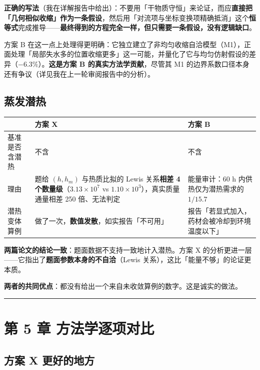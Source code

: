 \textbf{正确的写法}（我在详解报告中给出）：不要用「干物质守恒」来论证，而应\textbf{直接把「几何相似收缩」作为一条假设}，然后用「对流项与坐标变换项精确抵消」这个\textbf{恒等式}完成推导——\textbf{最终得到的方程完全一样，但只需要一条假设，没有逻辑缺口}。


方案 B 在这一点上处理得更明确：它独立建立了非均匀收缩自洽模型（M1），正面处理「局部失水多的位置收缩更多」这一可能，并量化了它与均匀仿射假设的差异（$-6.3\%$）。\textbf{这是方案 B 的真实方法学贡献}，尽管其 M1 的边界系数口径本身还有争议（详见我在上一轮审阅报告中的分析）。


\subsection{蒸发潜热}


\begin{center}
\small
\begin{tabular}{lll}
\toprule
 & 方案 X & 方案 B \\
\midrule
基准是否含潜热 & 不含 & 不含 \\
理由 & 题给 $(h,h_m)$ 与热质比拟的 Lewis 关系\textbf{相差 4 个数量级}（$3.13\times10^7$ vs $1.10\times10^3$），真实质量通量相差 250 倍、无法判定 & 能量审计：60 h 内供热仅为潜热需求的 $1/15.7$ \\
潜热变体算例 & 做了一次，\textbf{数值发散}，如实报告「不可用」 & 报告「若显式加入，药材会被冷却到环境温度以下」 \\
\bottomrule
\end{tabular}
\end{center}


\textbf{两篇论文的结论一致}：题面数据不支持一致地计入潜热。方案 X 的分析更进一层——它指出了\textbf{题面参数本身的不自洽}（Lewis 关系），这比「能量不够」的论证更本质。


\textbf{两者的共同优点}：都没有给出一个来自未收敛算例的数字。这是诚实的做法。


\vspace{1mm}\hrule\vspace{1mm}


\section{第 5 章 方法学逐项对比}


\subsection{方案 X 更好的地方}


